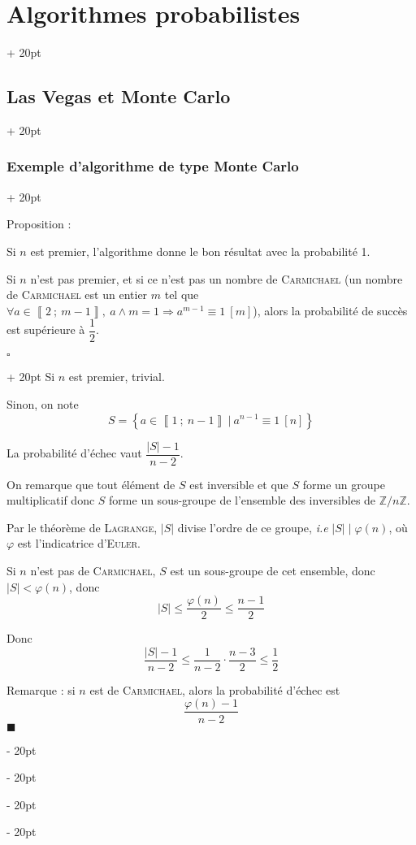\documentclass[a4paper, 12pt, twoside]{article}
\newcommand{\Z}{\mathbb{Z}} %
\newcommand{\nset}[2]{\left\llbracket #1\ ;\ #2 \right\rrbracket}
\newcommand{\set}[1]{\left\{ #1 \right\}}
\newcommand{\abs}[1]{\left\lvert #1 \right\rvert}
\renewcommand{\le}{\leqslant}
\newcommand{\ind}[1][20pt]{\advance\leftskip + #1}
\newcommand{\deind}[1][20pt]{\advance\leftskip - #1}
\newenvironment{indt}[2][20pt]{#2 \par \ind[#1]}{\par \deind} %
\newenvironment{proof}[1][{}]{\begin{indt}{$\square$ #1}}{$\blacksquare$ \end{indt}}
\newcommand{\1}{\mathbbm 1}
\begin{document}
\begin{indt}{\section{Algorithmes probabilistes}}
\begin{indt}{\subsection{Las Vegas et Monte Carlo}}
\begin{indt}{\subsubsection{Exemple d'algorithme de type Monte Carlo}}
                \vspace{6pt}
                
                Proposition :
                \begin{emphBox}
                    Si $n$ est premier, l'algorithme donne le bon résultat avec la probabilité 1.

                    Si $n$ n'est pas premier, et si ce n'est pas un nombre de \textsc{Carmichael} (un nombre de \textsc{Carmichael} est un entier $m$ tel que $\forall a \in \nset{2}{m - 1},\ a \wedge m = 1 \Rightarrow a^{m - 1} \equiv 1\ [m]$), alors la probabilité de succès est supérieure à $\dfrac 1 2$.
                \end{emphBox}

                \vspace{6pt}
                
                \begin{proof}
                    Si $n$ est premier, trivial.

                    Sinon, on note
                    \[
                        S = \set{a \in \nset 1 {n - 1}\ |\ a^{n - 1} \equiv 1\ [n]}
                    \]

                    La probabilité d'échec vaut $\dfrac{\abs S - 1}{n - 2}$.

                    On remarque que tout élément de $S$ est inversible et que $S$ forme un groupe multiplicatif donc $S$ forme un sous-groupe de l'ensemble des inversibles de $\Z/n\Z$.

                    Par le théorème de \textsc{Lagrange}, $\abs S$ divise l'ordre de ce groupe, \textit{i.e} $\abs{S} \mid \varphi(n)$, où $\varphi$ est l'indicatrice d'\textsc{Euler}.

                    Si $n$ n'est pas de \textsc{Carmichael}, $S$ est un sous-groupe de cet ensemble, donc $\abs S < \varphi(n)$, donc
                    \[
                        \abs S \le \dfrac{\varphi(n)} 2 \le \dfrac{n - 1} 2
                    \]

                    Donc
                    \[
                        \dfrac{\abs S - 1}{n - 2}
                        \le \dfrac{1}{n - 2} \cdot \dfrac{n - 3}{2}
                        \le \dfrac 1 2
                    \]

                    Remarque : si $n$ est de \textsc{Carmichael}, alors la probabilité d'échec est
                    \[
                        \dfrac{\varphi(n) - 1}{n - 2}
                    \]
                \end{proof}


\end{indt}
\end{indt}
\end{indt}
\end{document}
